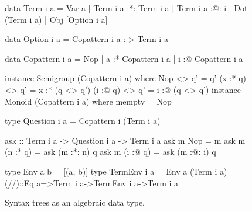\documentclass[sigplan,screen]{acmart}
\begin{document}
\begin{figure}
\centering
\begin{haskell}
data Term i a
  = Var a
  | Term i a :*: Term i a
  | Term i a :@: i
  | Dot (Term i a)
  | Obj [Option i a]

data Option i a = Copattern i a :-> Term i a

data Copattern i a
  = Nop
  | a :* Copattern i a
  | i :@ Copattern i a

instance Semigroup (Copattern i a) where
  Nop      <> q' = q'
  (x :* q) <> q' = x :* (q <> q')
  (i :@ q) <> q' = i :@ (q <> q')
instance Monoid (Copattern i a) where
  mempty = Nop

type Question i a = Copattern i (Term i a)

ask :: Term i a -> Question i a -> Term i a
ask m Nop      = m
ask m (n :* q) = ask (m :*: n) q
ask m (i :@ q) = ask (m :@: i) q

type Env a b = [(a, b)]
type TermEnv i a = Env a (Term i a)
(//)::Eq a=>Term i a->TermEnv i a->Term i a
\end{haskell}
\caption{Syntax trees as an algebraic data type.}
\label{fig:block-syntax-code}
\end{figure}




\end{document}
